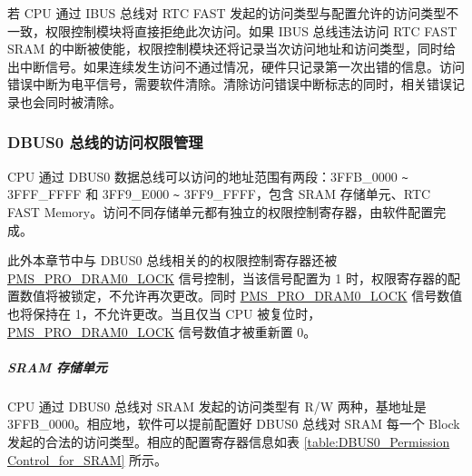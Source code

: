 \documentclass[main\_\_CN.tex]{subfiles}
\begin{document}
若 CPU 通过 IBUS 总线对 RTC FAST 发起的访问类型与配置允许的访问类型不一致，权限控制模块将直接拒绝此次访问。如果 IBUS 总线违法访问 RTC FAST SRAM 的中断被使能，权限控制模块还将记录当次访问地址和访问类型，同时给出中断信号。如果连续发生访问不通过情况，硬件只记录第一次出错的信息。访问错误中断为电平信号，需要软件清除。清除访问错误中断标志的同时，相关错误记录也会同时被清除。


\subsubsection{DBUS0 总线的访问权限管理}
CPU 通过 DBUS0 数据总线可以访问的地址范围有两段：\hexprefix{}3FFB\_0000 \verb+~+ \hexprefix{}3FFF\_FFFF 和 \hexprefix{}3FF9\_E000 \verb+~+ \hexprefix{}3FF9\_FFFF，包含 SRAM 存储单元、RTC FAST Memory。访问不同存储单元都有独立的权限控制寄存器，由软件配置完成。

此外本章节中与 DBUS0 总线相关的的权限控制寄存器还被 \hyperref[fielddesc:PMSPRODRAM0LOCK]{PMS\_PRO\_DRAM0\_LOCK} 信号控制，当该信号配置为 1 时，权限寄存器的配置数值将被锁定，不允许再次更改。同时 \hyperref[fielddesc:PMSPRODRAM0LOCK]{PMS\_PRO\_DRAM0\_LOCK} 信号数值也将保持在 1，不允许更改。当且仅当 CPU 被复位时，\hyperref[fielddesc:PMSPRODRAM0LOCK]{PMS\_PRO\_DRAM0\_LOCK} 信号数值才被重新置 0。

\subparagraph{ SRAM 存储单元 }\label{DUBS0PermissionControl}
CPU 通过 DBUS0 总线对 SRAM 发起的访问类型有 R/W 两种，基地址是 \hexprefix{}3FFB\_0000。相应地，软件可以提前配置好 DBUS0 总线对 SRAM 每一个 Block 发起的合法的访问类型。相应的配置寄存器信息如表 \ref{table:DBUS0_Permission Control_for_SRAM} 所示。
\end{document}
